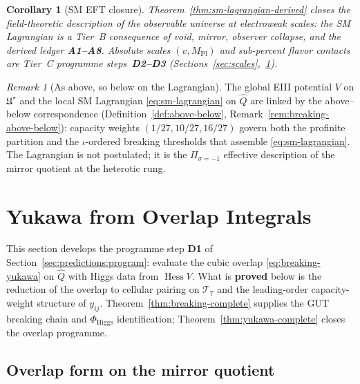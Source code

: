 \documentclass[aps,prd,onecolumn,amsmath,amssymb,nofootinbib,11pt]{revtex4-2}
\numberwithin{equation}{section}
\theoremstyle{plain}
\newtheorem{corollary}[theorem]{Corollary}
\theoremstyle{definition}
\theoremstyle{remark}
\newtheorem{remark}[theorem]{Remark}
\newcommand{\MPl}{M_{\mathrm{Pl}}}
\newcommand{\Hess}{\operatorname{Hess}}
\begin{document}
\begin{corollary}[SM EFT closure]
\label{cor:sm-lagrangian-closure}
Theorem~\ref{thm:sm-lagrangian-derived} closes the \emph{field-theoretic}
description of the observable universe at electroweak scales: the SM
Lagrangian is a Tier~B consequence of void, mirror, observer collapse, and the
derived ledger \textbf{A1--A8}. Absolute scales $(v,\MPl)$ and sub-percent
flavor contacts are Tier~C programme steps~\textbf{D2--D3}
(Sections~\ref{sec:scales},~\ref{sec:yukawa}).
\end{corollary}

\begin{remark}[As above, so below on the Lagrangian]
The global EIII potential $V$ on $\mathfrak{U}^\star$ and the local SM
Lagrangian \eqref{eq:sm-lagrangian} on $\hat Q$ are linked by the
above--below correspondence (Definition~\ref{def:above-below},
Remark~\ref{rem:breaking-above-below}): capacity weights
$(1/27,10/27,16/27)$ govern both the profinite partition and the
$\iota$-ordered breaking thresholds that assemble \eqref{eq:sm-lagrangian}.
The Lagrangian is not postulated; it is the $\Pi_{\sigma=-1}$ effective
description of the mirror quotient at the heterotic rung.
\end{remark}%
\section{Yukawa from Overlap Integrals}
\label{sec:yukawa}

This section develops the programme step \textbf{D1} of
Section~\ref{sec:predictions:program}: evaluate the cubic overlap
\eqref{eq:breaking-yukawa} on $\hat Q$ with Higgs data from $\Hess V$.
What is \textbf{proved} below is the reduction of the overlap to cellular
pairing on $\mathcal{T}_7$ and the leading-order capacity-weight structure of
$y_{ij}$. Theorem~\ref{thm:breaking-complete} supplies the GUT breaking chain and
$\Phi_{\mathrm{Higgs}}$ identification; Theorem~\ref{thm:yukawa-complete}
closes the overlap programme.

\subsection{Overlap form on the mirror quotient}
\label{sec:yukawa:overlap}
\end{document}
